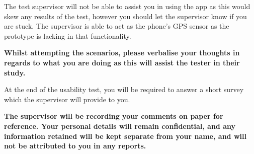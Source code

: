 \documentclass[a4paper, parskip=half]{scrartcl}
\begin{document}
The test supervisor will not be able to assist you in using the app as this would skew
any results of the test, however you should let the supervisor know if you are stuck.
The supervisor is able to act as the phone's GPS sensor as the prototype is lacking
in that functionality.


\textbf{Whilst attempting the scenarios, please verbalise your thoughts in
regards to what you are doing as this will assist the tester in their study.}

At the end of the usability test, you will be required to answer a short survey
which the supervisor will provide to you.

\textbf{The supervisor will be recording your comments on paper for reference. Your personal
details will remain confidential, and any information retained will be kept
separate from your name, and will not be attributed to you in any reports.}
\end{document}
